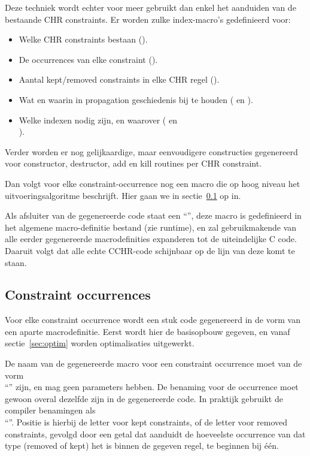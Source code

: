 Deze techniek wordt echter voor meer gebruikt dan enkel het aanduiden van de bestaande CHR constraints. Er worden zulke index-macro's gedefinieerd voor: \begin{itemize}
\item Welke CHR constraints bestaan ().
\item De occurrences van elke constraint ().
\item Aantal kept/removed constraints in elke CHR regel ().
\item Wat en waarin in propagation geschiedenis bij te houden ( en ).
\item Welke indexen nodig zijn, en waarover ( en \\ ).
\end{itemize}
Verder worden er nog gelijkaardige, maar eenvoudigere constructies gegenereerd voor constructor, destructor, add en kill routines per CHR constraint.

Dan volgt voor elke constraint-occurrence nog een macro die op hoog niveau het uitvoeringsalgoritme beschrijft. Hier gaan we in sectie~\ref{gencode-conocc} op in.

Als afsluiter van de gegenereerde code staat een ``'', deze macro is gedefinieerd in het algemene macro-definitie bestand (zie runtime), en zal gebruikmakende van alle eerder gegenereerde macrodefinities expanderen tot de uiteindelijke C code. Daaruit volgt dat alle echte CCHR-code schijnbaar op de lijn van deze  komt te staan.

\subsection{Constraint occurrences} \label{gencode-conocc}

Voor elke constraint occurrence wordt een stuk code gegenereerd in de vorm van een aparte macrodefinitie. Eerst wordt hier de basisopbouw gegeven, en vanaf sectie~\ref{sec:optim} worden optimalisaties uitgewerkt.

De naam van de gegenereerde macro voor een constraint occurrence moet van de vorm \\ ``'' zijn, en mag geen parameters hebben. De benaming voor de occurrence moet gewoon overal dezelfde zijn in de gegenereerde code. In praktijk gebruikt de compiler benamingen als \\ ``''. Positie is hierbij de letter  voor kept constraints, of de letter  voor removed constraints, gevolgd door een getal dat aanduidt de hoeveelste occurrence van dat type (removed of kept) het is binnen de gegeven regel, te beginnen bij \'e\'en.

